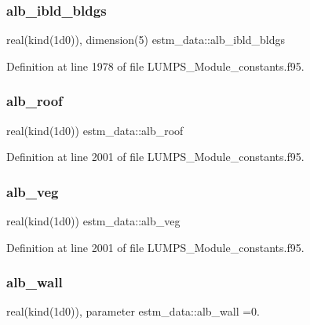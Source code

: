 \subsubsection{\texorpdfstring{alb\+\_\+ibld\+\_\+bldgs}{alb\_ibld\_bldgs}}
{\footnotesize\ttfamily real(kind(1d0)), dimension(5) estm\+\_\+data\+::alb\+\_\+ibld\+\_\+bldgs}



Definition at line 1978 of file L\+U\+M\+P\+S\+\_\+\+Module\+\_\+constants.\+f95.

\mbox{\label{namespaceestm__data_a3c6b8b304a766dc70d8ca7023dac26ce}} 
\subsubsection{\texorpdfstring{alb\+\_\+roof}{alb\_roof}}
{\footnotesize\ttfamily real(kind(1d0)) estm\+\_\+data\+::alb\+\_\+roof}



Definition at line 2001 of file L\+U\+M\+P\+S\+\_\+\+Module\+\_\+constants.\+f95.

\mbox{\label{namespaceestm__data_a0c172243ae014ca55f16cdf3fdc0b71e}} 
\subsubsection{\texorpdfstring{alb\+\_\+veg}{alb\_veg}}
{\footnotesize\ttfamily real(kind(1d0)) estm\+\_\+data\+::alb\+\_\+veg}



Definition at line 2001 of file L\+U\+M\+P\+S\+\_\+\+Module\+\_\+constants.\+f95.

\mbox{\label{namespaceestm__data_acdf885f5459c2301613674450cb0d4df}} 
\subsubsection{\texorpdfstring{alb\+\_\+wall}{alb\_wall}}
{\footnotesize\ttfamily real(kind(1d0)), parameter estm\+\_\+data\+::alb\+\_\+wall =0.}



